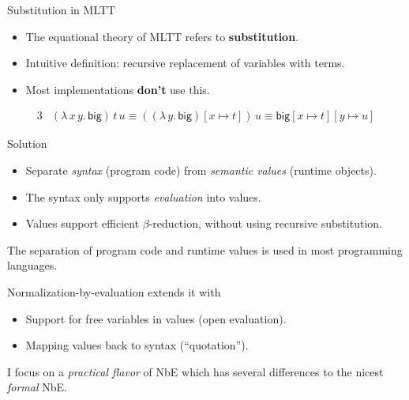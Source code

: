 \documentclass[dvipsnames]{beamer}
\newcommand{\ms}[1]{\mathsf{#1}}
\begin{document}
\begin{frame}{Substitution in MLTT}

\begin{itemize}
\item The equational theory of MLTT refers to \textbf{substitution}.
\pause

\item Intuitive definition: recursive replacement
  of variables with terms.
\pause

\item Most implementations \textbf{don't} use this.
\end{itemize}
\begin{alignat*}{3}
  & (\lambda\,x\,y.\,\ms{big})\,t\,u \equiv ((\lambda\,y.\,\ms{big})[x \mapsto t])\,u \equiv
    \ms{big}[x \mapsto t][y \mapsto u]
\end{alignat*}
\pause

\begin{block}{Solution}
\begin{itemize}
\item Separate \emph{syntax} (program code) from \emph{semantic values} (runtime objects).
\item The syntax only supports \emph{evaluation} into values.
\item Values support efficient $\beta$-reduction, without
      using recursive substitution.
\end{itemize}
\end{block}

\end{frame}

\begin{frame}{}

The separation of program code and runtime values is used in most programming languages.
\vspace{2em}
\pause

\alert{Normalization-by-evaluation} extends it with
\begin{itemize}
  \item Support for free variables in values (open evaluation).
  \item Mapping values back to syntax (``quotation'').
\end{itemize}
\vspace{1em}
\pause

I focus on a \emph{practical flavor} of NbE which has several differences to the nicest \emph{formal} NbE.

\end{frame}
\end{document}
